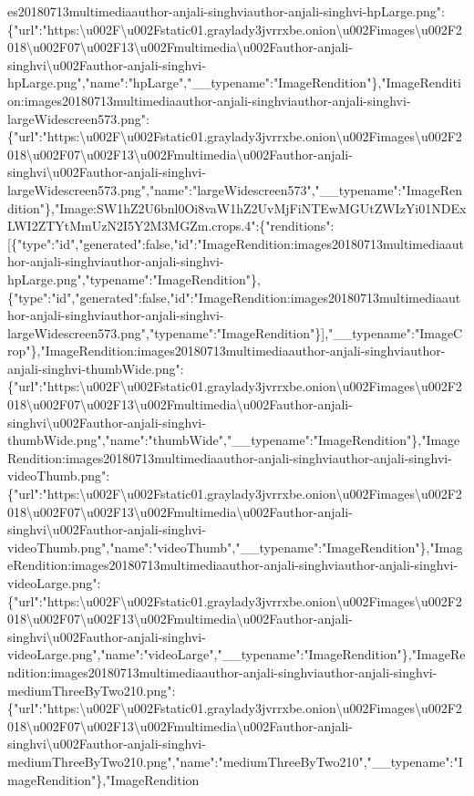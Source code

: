 es20180713multimediaauthor-anjali-singhviauthor-anjali-singhvi-hpLarge.png":\{"url":"https:\textbackslash{}u002F\textbackslash{}u002Fstatic01.graylady3jvrrxbe.onion\textbackslash{}u002Fimages\textbackslash{}u002F2018\textbackslash{}u002F07\textbackslash{}u002F13\textbackslash{}u002Fmultimedia\textbackslash{}u002Fauthor-anjali-singhvi\textbackslash{}u002Fauthor-anjali-singhvi-hpLarge.png","name":"hpLarge","\_\_typename":"ImageRendition"\},"ImageRendition:images20180713multimediaauthor-anjali-singhviauthor-anjali-singhvi-largeWidescreen573.png":\{"url":"https:\textbackslash{}u002F\textbackslash{}u002Fstatic01.graylady3jvrrxbe.onion\textbackslash{}u002Fimages\textbackslash{}u002F2018\textbackslash{}u002F07\textbackslash{}u002F13\textbackslash{}u002Fmultimedia\textbackslash{}u002Fauthor-anjali-singhvi\textbackslash{}u002Fauthor-anjali-singhvi-largeWidescreen573.png","name":"largeWidescreen573","\_\_typename":"ImageRendition"\},"Image:SW1hZ2U6bnl0Oi8vaW1hZ2UvMjFiNTEwMGUtZWIzYi01NDExLWI2ZTYtMmUzN2I5Y2M3MGZm.crops.4":\{"renditions":{[}\{"type":"id","generated":false,"id":"ImageRendition:images20180713multimediaauthor-anjali-singhviauthor-anjali-singhvi-hpLarge.png","typename":"ImageRendition"\},\{"type":"id","generated":false,"id":"ImageRendition:images20180713multimediaauthor-anjali-singhviauthor-anjali-singhvi-largeWidescreen573.png","typename":"ImageRendition"\}{]},"\_\_typename":"ImageCrop"\},"ImageRendition:images20180713multimediaauthor-anjali-singhviauthor-anjali-singhvi-thumbWide.png":\{"url":"https:\textbackslash{}u002F\textbackslash{}u002Fstatic01.graylady3jvrrxbe.onion\textbackslash{}u002Fimages\textbackslash{}u002F2018\textbackslash{}u002F07\textbackslash{}u002F13\textbackslash{}u002Fmultimedia\textbackslash{}u002Fauthor-anjali-singhvi\textbackslash{}u002Fauthor-anjali-singhvi-thumbWide.png","name":"thumbWide","\_\_typename":"ImageRendition"\},"ImageRendition:images20180713multimediaauthor-anjali-singhviauthor-anjali-singhvi-videoThumb.png":\{"url":"https:\textbackslash{}u002F\textbackslash{}u002Fstatic01.graylady3jvrrxbe.onion\textbackslash{}u002Fimages\textbackslash{}u002F2018\textbackslash{}u002F07\textbackslash{}u002F13\textbackslash{}u002Fmultimedia\textbackslash{}u002Fauthor-anjali-singhvi\textbackslash{}u002Fauthor-anjali-singhvi-videoThumb.png","name":"videoThumb","\_\_typename":"ImageRendition"\},"ImageRendition:images20180713multimediaauthor-anjali-singhviauthor-anjali-singhvi-videoLarge.png":\{"url":"https:\textbackslash{}u002F\textbackslash{}u002Fstatic01.graylady3jvrrxbe.onion\textbackslash{}u002Fimages\textbackslash{}u002F2018\textbackslash{}u002F07\textbackslash{}u002F13\textbackslash{}u002Fmultimedia\textbackslash{}u002Fauthor-anjali-singhvi\textbackslash{}u002Fauthor-anjali-singhvi-videoLarge.png","name":"videoLarge","\_\_typename":"ImageRendition"\},"ImageRendition:images20180713multimediaauthor-anjali-singhviauthor-anjali-singhvi-mediumThreeByTwo210.png":\{"url":"https:\textbackslash{}u002F\textbackslash{}u002Fstatic01.graylady3jvrrxbe.onion\textbackslash{}u002Fimages\textbackslash{}u002F2018\textbackslash{}u002F07\textbackslash{}u002F13\textbackslash{}u002Fmultimedia\textbackslash{}u002Fauthor-anjali-singhvi\textbackslash{}u002Fauthor-anjali-singhvi-mediumThreeByTwo210.png","name":"mediumThreeByTwo210","\_\_typename":"ImageRendition"\},"ImageRendition